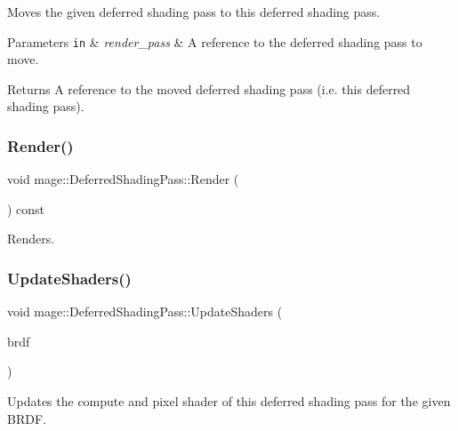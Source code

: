 Moves the given deferred shading pass to this deferred shading pass.


\begin{DoxyParams}[1]{Parameters}
\mbox{\tt in}  & {\em render\+\_\+pass} & A reference to the deferred shading pass to move. \\
\hline
\end{DoxyParams}
\begin{DoxyReturn}{Returns}
A reference to the moved deferred shading pass (i.\+e. this deferred shading pass). 
\end{DoxyReturn}
\hypertarget{classmage_1_1_deferred_shading_pass_abc1566b2c89f2f043d6ec73f313e388a}{}\label{classmage_1_1_deferred_shading_pass_abc1566b2c89f2f043d6ec73f313e388a} 
\subsubsection{\texorpdfstring{Render()}{Render()}}
{\footnotesize\ttfamily void mage\+::\+Deferred\+Shading\+Pass\+::\+Render (\begin{DoxyParamCaption}{ }\end{DoxyParamCaption}) const\hspace{0.3cm}{\ttfamily [noexcept]}}

Renders. \hypertarget{classmage_1_1_deferred_shading_pass_a1be48c61dfb255a1641bae23d5277e4f}{}\label{classmage_1_1_deferred_shading_pass_a1be48c61dfb255a1641bae23d5277e4f} 
\subsubsection{\texorpdfstring{Update\+Shaders()}{UpdateShaders()}}
{\footnotesize\ttfamily void mage\+::\+Deferred\+Shading\+Pass\+::\+Update\+Shaders (\begin{DoxyParamCaption}\item[{\hyperlink{namespacemage_ae7a7a03a7b34d7e2689689bb8295cd38}{B\+R\+D\+F\+Type}}]{brdf }\end{DoxyParamCaption})\hspace{0.3cm}{\ttfamily [private]}}

Updates the compute and pixel shader of this deferred shading pass for the given B\+R\+DF.

